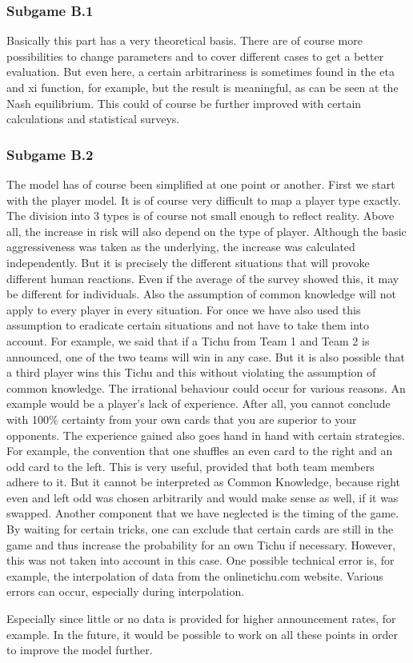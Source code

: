 \subsubsection{Subgame B.1}

Basically this part has a very theoretical basis. There are of course more possibilities to change parameters and to cover different cases to get a better evaluation.
But even here, a certain arbitrariness is sometimes found in the eta and xi function, for example, but the result is meaningful, as can be seen at the Nash equilibrium. This could of course be further improved with certain calculations and statistical surveys.

\subsubsection{Subgame B.2}

The model has of course been simplified at one point or another.
First we start with the player model. It is of course very difficult to map a player type exactly. The division into 3 types is of course not small enough to reflect reality. Above all, the increase in risk will also depend on the type of player. Although the basic aggressiveness was taken as the underlying, the increase was calculated independently. But it is precisely the different situations that will provoke different human reactions. Even if the average of the survey showed this, it may be different for individuals.
Also the assumption of common knowledge will not apply to every player in every situation. For once we have also used this assumption to eradicate certain situations and not have to take them into account.
For example, we said that if a Tichu from Team 1 and Team 2 is announced, one of the two teams will win in any case. But it is also possible that a third player wins this Tichu and this without violating the assumption of common knowledge.
The irrational behaviour could occur for various reasons.
An example would be a player's lack of experience. After all, you cannot conclude with 100$\%$ certainty from your own cards that you are superior to your opponents.
The experience gained also goes hand in hand with certain strategies. For example, the convention that one shuffles an even card to the right and an odd card to the left. This is very useful, provided that both team members adhere to it. But it cannot be interpreted as Common Knowledge, because right even and left odd was chosen arbitrarily and would make sense as well, if it was swapped.
Another component that we have neglected is the timing of the game. By waiting for certain tricks, one can exclude that certain cards are still in the game and thus increase the probability for an own Tichu if necessary. However, this was not taken into account in this case.
One possible technical error is, for example, the interpolation of data from the onlinetichu.com website. Various errors can occur, especially during interpolation.


Especially since little or no data is provided for higher announcement rates, for example.
In the future, it would be possible to work on all these points in order to improve the model further.



